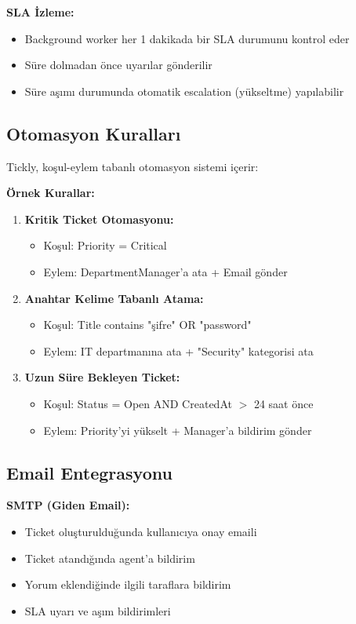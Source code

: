 \documentclass[12pt,a4paper]{article}
\begin{document}
\textbf{SLA İzleme:}
\begin{itemize}
    \item Background worker her 1 dakikada bir SLA durumunu kontrol eder
    \item Süre dolmadan önce uyarılar gönderilir
    \item Süre aşımı durumunda otomatik escalation (yükseltme) yapılabilir
\end{itemize}

\subsection{Otomasyon Kuralları}

Tickly, koşul-eylem tabanlı otomasyon sistemi içerir:

\textbf{Örnek Kurallar:}

\begin{enumerate}
    \item \textbf{Kritik Ticket Otomasyonu:}
    \begin{itemize}
        \item Koşul: Priority = Critical
        \item Eylem: DepartmentManager'a ata + Email gönder
    \end{itemize}
    
    \item \textbf{Anahtar Kelime Tabanlı Atama:}
    \begin{itemize}
        \item Koşul: Title contains "şifre" OR "password"
        \item Eylem: IT departmanına ata + "Security" kategorisi ata
    \end{itemize}
    
    \item \textbf{Uzun Süre Bekleyen Ticket:}
    \begin{itemize}
        \item Koşul: Status = Open AND CreatedAt $>$ 24 saat önce
        \item Eylem: Priority'yi yükselt + Manager'a bildirim gönder
    \end{itemize}
\end{enumerate}

\subsection{Email Entegrasyonu}

\textbf{SMTP (Giden Email):}
\begin{itemize}
    \item Ticket oluşturulduğunda kullanıcıya onay emaili
    \item Ticket atandığında agent'a bildirim
    \item Yorum eklendiğinde ilgili taraflara bildirim
    \item SLA uyarı ve aşım bildirimleri
\end{itemize}
\end{document}
